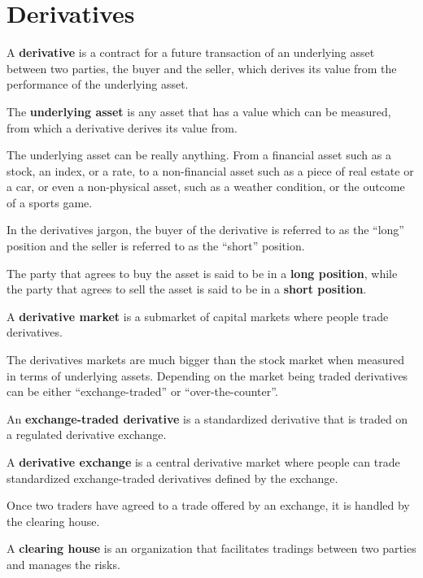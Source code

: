 \section{Derivatives}

\bd[Derivative]
A \textbf{derivative} is a contract for a future transaction of an underlying asset between two parties, the buyer and
the seller, which derives its value from the performance of the underlying asset.
\ed

The \textbf{underlying asset} is any asset that has a value which can be measured, from which a derivative derives its
value from.
\ed

\be
The underlying asset can be really anything. From a financial asset such as a stock, an index, or a rate, to a
non-financial asset such as a piece of real estate or a car, or even a non-physical asset, such as a weather condition,
or the outcome of a sports game.
\ee

In the derivatives jargon, the buyer of the derivative is referred to as the ``long'' position and the seller is
referred to as the ``short'' position.

The party that agrees to buy the asset is said to be in a \textbf{long position}, while the party that agrees to sell
the asset is said to be in a \textbf{short position}.
\ed

A \textbf{derivative market} is a submarket of capital markets where people trade derivatives.
\ed

The derivatives markets are much bigger than the stock market when measured in terms of underlying assets. Depending
on the market being traded derivatives can be either ``exchange-traded'' or ``over-the-counter''.

An \textbf{exchange-traded derivative} is a standardized derivative that is traded on a regulated derivative exchange.
\ed

A \textbf{derivative exchange} is a central derivative market where people can trade standardized exchange-traded
derivatives defined by the exchange.
\ed

Once two traders have agreed to a trade offered by an exchange, it is handled by the clearing house.

A \textbf{clearing house} is an organization that facilitates tradings between two parties and manages the risks.
\ed

